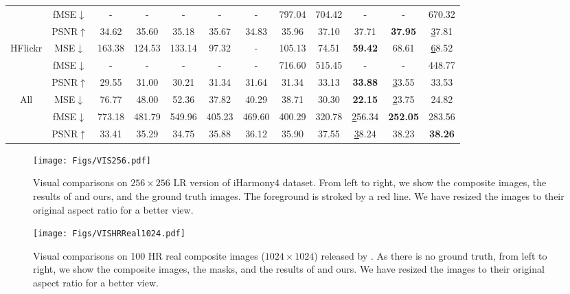 \documentclass[10pt,journal,twocolumn,twoside]{IEEEtran}
\begin{document}
\begin{table*}
{\begin{tabular}{@{}c|c|ccccccccc|c@{}}
                            & fMSE$\downarrow$   & -      & -      & -      & -       & -       & 797.04    & 704.42 & -              & -               & 670.32         \\
                            & PSNR$\uparrow$   & 34.62  & 35.60   & 35.18  & 35.67   & 34.83   & 35.96     & 37.10   & 37.71          & \textbf{37.95}  & {\ul 37.81}    \\ \midrule
\multirow{3}{*}{HFlickr}    & MSE$\downarrow$    & 163.38 & 124.53 & 133.14 & 97.32   & -       & 105.13    & 74.51  & \textbf{59.42} & 68.61           & {\ul 68.52}    \\
                            & fMSE$\downarrow$   & -      & -      & -      & -       & -       & 716.60     & 515.45 & -              & -               & 448.77         \\
                            & PSNR$\uparrow$   & 29.55  & 31.00     & 30.21  & 31.34   & 31.64   & 31.34     & 33.13  & \textbf{33.88} & {\ul 33.55}     & 33.53          \\ \midrule
\multirow{3}{*}{All}        & MSE$\downarrow$    & 76.77  & 48.00     & 52.36  & 37.82   & 40.29   & 38.71     & 30.30   & \textbf{22.15} & {\ul 23.75}     & 24.82          \\
                            & fMSE$\downarrow$   & 773.18 & 481.79 & 549.96 & 405.23  & 469.60   & 400.29    & 320.78 & {\ul 256.34}   & \textbf{252.05} & 283.56         \\
                            & PSNR$\uparrow$   & 33.41  & 35.29  & 34.75  & 35.88   & 36.12   & 35.90      & 37.55  & {\ul 38.24}    & 38.23           & \textbf{38.26} \\ \bottomrule
\end{tabular}}
\end{table*}

\begin{figure}[t]
  \centering
   \texttt{[image: Figs/VIS256.pdf]}
   \caption{Visual comparisons on $256\times 256$ LR version of iHarmony4 dataset. From left to right, we show the composite images, the results of \cite{cong2020dovenet, ling2021region, guo2021intrinsic, guo2021image} and ours, and the ground truth images. The foreground is stroked by a red line. We have resized the images to their original aspect ratio for a better view.}
   \label{fig:VIS256}
\end{figure}

\begin{figure}[t]
  \centering
   \texttt{[image: Figs/VISHRReal1024.pdf]}
   \caption{Visual comparisons on 100 HR real composite images ($1024\times1024$) released by \cite{cong2022high}. As there is no ground truth, from left to right, we show the composite images, the masks, and the results of \cite{cong2022high} and ours. We have resized the images to their original aspect ratio for a better view.}
   \label{fig:VISHRReal1024}
\end{figure}
\end{document}
